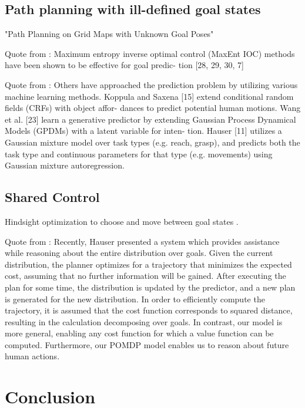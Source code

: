 \subsection{Path planning with ill-defined goal states}
"Path Planning on Grid Maps with Unknown Goal Poses"

Quote from \cite{javdani2015shared}:
Maximum  entropy  inverse  optimal  control  (MaxEnt  IOC)
methods  have  been  shown  to  be  effective  for  goal  predic-
tion [28, 29, 30, 7]

Quote from \cite{javdani2015shared}:
Others have approached the prediction problem by utilizing
various machine learning methods. Koppula and Saxena [15]
extend  conditional  random  fields  (CRFs)  with  object  affor-
dances  to  predict  potential  human  motions.  Wang  et  al.  [23]
learn  a  generative  predictor  by  extending  Gaussian  Process
Dynamical Models (GPDMs) with a latent variable for inten-
tion. Hauser [11] utilizes a Gaussian mixture model over task
types  (e.g.  reach,  grasp),  and  predicts  both  the  task  type  and
continuous  parameters  for  that  type  (e.g.  movements)  using
Gaussian mixture autoregression.

\subsection{Shared Control}
Hindsight optimization to choose and move between goal states
\cite{javdani2015shared}.

Quote from \cite{javdani2015shared}:
Recently,  Hauser  presented  a  system  which  provides
assistance  while  reasoning  about  the  entire  distribution  over
goals.  Given  the  current  distribution,  the  planner  optimizes
for  a  trajectory  that  minimizes  the  expected  cost,  assuming
that no further information will be gained. After executing the
plan for some time, the distribution is updated by the predictor,
and a new plan is generated for the new distribution. In order
to  efficiently  compute  the  trajectory,  it  is  assumed  that  the
cost function corresponds to squared distance, resulting in the
calculation decomposing over goals. In contrast, our model is
more  general,  enabling  any  cost  function  for  which  a  value
function  can  be  computed.  Furthermore,  our  POMDP  model
enables us to reason about future human actions.  \cite{hauser2013recognition}

\section{Conclusion}
